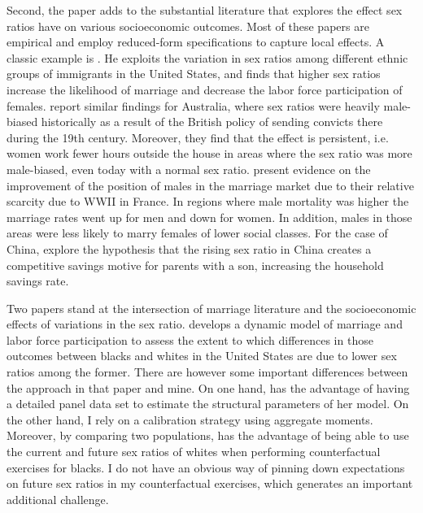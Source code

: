 \documentclass[12pt]{article}
\begin{document}
Second, the paper adds to the substantial literature that explores the effect sex ratios have on various socioeconomic outcomes. Most of these papers are empirical and employ reduced-form specifications to capture local effects. A classic example is \cite{angrist02}. He exploits the variation in sex ratios among different ethnic groups of immigrants in the United States, and finds that higher sex ratios increase the likelihood of marriage and decrease the labor force participation of females. \cite{grosjeankhattar19} report similar findings for Australia, where sex ratios were heavily male-biased historically as a result of the British policy of sending convicts there during the 19th century. Moreover, they find that the effect is persistent, i.e. women work fewer hours outside the house in areas where the sex ratio was more male-biased, even today with a normal sex ratio. \cite{abramitzkyetal11} present evidence on the improvement of the position of males in the marriage market due to their relative scarcity due to WWII in France. In regions where male mortality was higher the marriage rates went up for men and down for women. In addition, males in those areas were less likely to marry females of lower social classes. For the case of China, \cite{weizhang11} explore the hypothesis that the rising sex ratio in China creates a competitive savings motive for parents with a son, increasing the household savings rate. 

Two papers stand at the intersection of marriage literature and the socioeconomic effects of variations in the sex ratio. \cite{seitz09} develops a dynamic model of marriage and labor force participation to assess the extent to which differences in those outcomes between blacks and whites in the United States are due to lower sex ratios among the former. There are however some important differences between the approach in that paper and mine. On one hand, \cite{seitz09} has the advantage of having a detailed panel data set to estimate the structural parameters of her model. On the other hand, I rely on a calibration strategy using aggregate moments. Moreover, by comparing two populations, \cite{seitz09} has the advantage of being able to use the current and future sex ratios of whites when performing counterfactual exercises for blacks. I do not have an obvious way of pinning down expectations on future sex ratios in my counterfactual exercises, which generates an important additional challenge.
\end{document}
